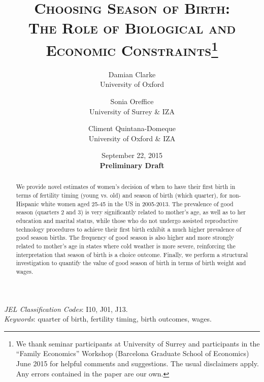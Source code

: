 \documentclass[a4paper, 12 pt]{article}
\theoremstyle{plain}
\begin{document}
\title{\Large{\textsc{Choosing Season of Birth:}}\\ \Large{\textsc{The Role of Biological and Economic Constraints}}\thanks{\scriptsize{We thank seminar participants at University of Surrey and participants in the ``Family Economics'' Workshop (Barcelona Graduate School of Economics) June 2015 for helpful comments and suggestions. The usual disclaimers apply. Any errors contained in the paper are our own.}}}
\author{\small{Damian Clarke} \\ \small{University of Oxford} \and \small{Sonia Oreffice} \\ \small{University of Surrey \& IZA}  \and \small{Climent Quintana-Domeque} \\ \small{University of Oxford \& IZA}}

\date{\small{September 22, 2015} \\ \vspace{2mm} \small{\textbf{Preliminary Draft}}}



\maketitle
\thispagestyle{empty}

\begin{abstract}
We provide novel estimates of women's decision of when to have their first birth in terms of fertility timing (young vs. old) and season of birth (which quarter), for non-Hispanic white women aged 25-45 in the US in 2005-2013. The prevalence of good season (quarters 2 and 3) is very significantly related to mother's age, as well as to her education and marital status, while those who do not undergo assisted reproductive technology procedures to achieve their first birth exhibit a much higher prevalence of good season births. The frequency of good season is also higher and more strongly related to mother's age in states where cold weather is more severe, reinforcing the interpretation that season of birth is a choice outcome. Finally, we perform a structural investigation to quantify the value of good season of birth in terms of birth weight and wages.
\end{abstract}
\emph{JEL Classification Codes}: I10, J01, J13.\\
\emph{Keywords}: quarter of birth, fertility timing, birth outcomes, wages.
\end{document}

